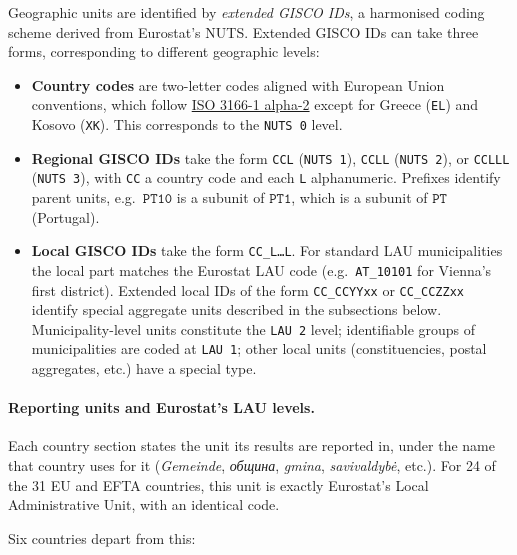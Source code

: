 
\noindent
Geographic units are identified by \textit{extended GISCO IDs}, a harmonised coding
scheme derived from Eurostat's NUTS.
Extended GISCO IDs can take three forms, corresponding to different geographic levels:
\begin{itemize}
\item \textbf{Country codes} are two-letter codes aligned with European Union
conventions, which follow
\href{https://www.iso.org/obp/ui/#search/code/}{ISO 3166-1 alpha-2}
except for Greece (\texttt{EL}) and Kosovo (\texttt{XK}).
This corresponds to the \texttt{NUTS 0} level.
\item \textbf{Regional GISCO IDs} take the form
\texttt{CCL} (\texttt{NUTS 1}),
\texttt{CCLL} (\texttt{NUTS 2}),
or \texttt{CCLLL} (\texttt{NUTS 3}),
with \texttt{CC} a country code and each \texttt{L} alphanumeric.
Prefixes identify parent units, e.g.\
$\mathtt{PT10}$ is a subunit of $\mathtt{PT1}$, which is a subunit of
$\mathtt{PT}$ (Portugal).
\item \textbf{Local GISCO IDs} take the form \texttt{CC\_L\ldots L}.
For standard LAU municipalities the local part matches the Eurostat LAU code
(e.g.\ \texttt{AT\_10101} for Vienna's first district).
Extended local IDs of the form \texttt{CC\_CCYYxx} or \texttt{CC\_CCZZxx}
identify special aggregate units described in the subsections below.
Municipality-level units constitute the \texttt{LAU 2} level; identifiable
groups of municipalities are coded at \texttt{LAU 1}; other local units
(constituencies, postal aggregates, etc.) have a special type.
\end{itemize}

\paragraph{Reporting units and Eurostat's LAU levels.}
Each country section states the unit its results are reported in, under the
name that country uses for it (\textit{Gemeinde}, \textit{община},
\textit{gmina}, \textit{savivaldyb\.e}, etc.). For 24 of the 31 EU and EFTA countries, this unit
is exactly Eurostat's Local Administrative Unit, with an identical code.

Six countries depart from this:

